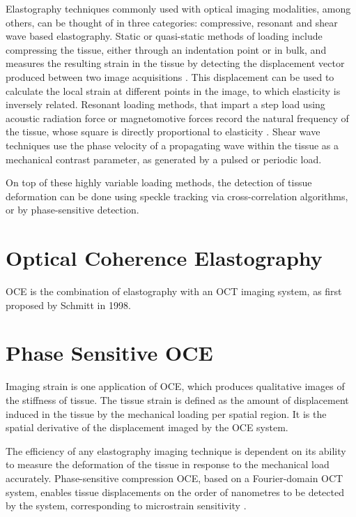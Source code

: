 Elastography techniques commonly used with optical imaging modalities, among others, can be thought of in three categories: compressive, resonant and shear wave based elastography. Static or quasi-static methods of loading include compressing the tissue, either through an indentation point or in bulk, and measures the resulting strain in the tissue by detecting the displacement vector produced between two image acquisitions \cite{kennedy_optical_2014}. This displacement can be used to calculate the local strain at different points in the image, to which elasticity is inversely related. Resonant loading methods, that impart a step load using acoustic radiation force or magnetomotive forces record the natural frequency of the tissue, whose square is directly proportional to elasticity \cite{kennedy_optical_2015}. Shear wave techniques use the phase velocity of a propagating wave within the tissue as a mechanical contrast parameter, as generated by a pulsed or periodic load. 

On top of these highly variable loading methods, the detection of tissue deformation can be done using speckle tracking via cross-correlation algorithms, or by phase-sensitive detection.

\section{Optical Coherence Elastography}
OCE is the combination of elastography with an OCT imaging system, as first proposed by Schmitt in 1998. 

\section{Phase Sensitive OCE}
Imaging strain is one application of OCE, which produces qualitative images of the stiffness of tissue. The tissue strain is defined as the amount of displacement induced in the tissue by the mechanical loading per spatial region. It is the spatial derivative of the displacement imaged by the OCE system.

The efficiency of any elastography imaging technique is dependent on its ability to measure the deformation of the tissue in response to the mechanical load accurately. Phase-sensitive compression OCE, based on a Fourier-domain OCT system, enables tissue displacements on the order of nanometres to be detected by the system, corresponding to microstrain sensitivity \cite{kennedy_review_2014}.
